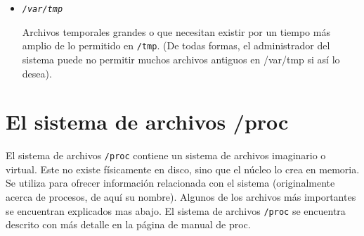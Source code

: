 \begin{itemize}
	\item 
        
	\textit{\texttt{/var/tmp}} 
        
	 Archivos temporales grandes o que necesitan existir por
	un tiempo más amplio de lo permitido en \texttt{/tmp}.  (De
	todas formas, el administrador del sistema puede no permitir muchos
	archivos antiguos en /var/tmp si así lo desea).  
	  \end{itemize}  


\section{ El sistema de archivos /proc}

El sistema de archivos \texttt{/proc} contiene un sistema de
archivos imaginario o virtual. Este no existe físicamente en disco, sino que el
núcleo lo crea en memoria. Se utiliza para ofrecer información relacionada con
el sistema (originalmente acerca de procesos, de aquí su nombre). Algunos de los
archivos más importantes se encuentran explicados mas abajo. El sistema de
archivos \texttt{/proc} se encuentra descrito con más detalle en la
página de manual de proc.


